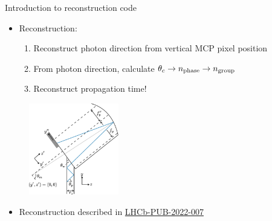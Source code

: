 \documentclass{beamer}
\begin{document}
\begin{frame}{Introduction to reconstruction code}
  \begin{itemize}
    \item{Reconstruction:}
    \begin{enumerate}
      \item{Reconstruct photon direction from vertical MCP pixel position}
      \item{From photon direction, calculate $\theta_c\to n_{\rm phase}\to n_{\rm group}$}
      \item{Reconstruct propagation time!}
    \end{enumerate}
  \end{itemize}
  \begin{figure}
    \includegraphics[width = 0.35\textwidth]{Plots/torch-geometry.pdf}
  \end{figure}
  \begin{itemize}
    \item{Reconstruction described in \href{https://www.overleaf.com/project/5d0b9c5a5005405666aacd05}{LHCb-PUB-2022-007}}
  \end{itemize}
\end{frame}
\end{document}

